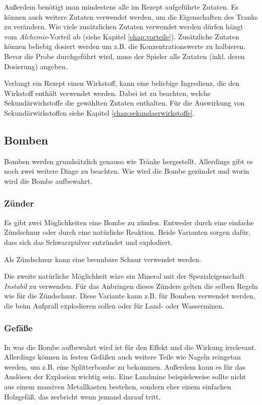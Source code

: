 Außerdem benötigt man mindestens alle im Rezept aufgeführte Zutaten. Es können auch weitere Zutaten verwendet werden, um die Eigenschaften des Tranks zu verändern. Wie viele zusätzlichen Zutaten verwendet werden dürfen hängt vom \textit{Alchemie}-Vorteil ab (siehe Kapitel \ref{chap:vorteile}). Zusätzliche Zutaten können beliebig dosiert werden um z.B. die Konzentrationswerte zu halbieren. Bevor die Probe durchgeführt wird, muss der Spieler alle Zutaten (inkl. deren Dosierung) angeben.

Verlangt ein Rezept einen Wirkstoff, kann eine beliebige Ingredienz, die den Wirkstoff enthält verwendet werden. Dabei ist zu beachten, welche Sekundärwirkstoffe die gewählten Zutaten enthalten. Für die Auswirkung von Sekundärwirkstoffen siehe Kapitel \ref{chap:sekundaerwirkstoffe}.

\subsection{Bomben}
\label{chap:herstellung_von_bomben}
Bomben werden grundsätzlich genauso wie Tränke hergestellt. Allerdings gibt es noch zwei weitere Dinge zu beachten. Wie wird die Bombe gezündet und worin wird die Bombe aufbewahrt.

\subsubsection{Zünder}
Es gibt zwei Möglichkeiten eine Bombe zu zünden. Entweder durch eine einfache Zündschnur oder durch eine natürliche Reaktion. Beide Varianten sorgen dafür, dass sich das Schwarzpulver entzündet und explodiert.

Als Zündschnur kann eine brennbare Schnur verwendet werden.

Die zweite natürliche Möglichkeit wäre ein Mineral mit der Spezialeigenschaft \textit{Instabil} zu verwenden. Für das Anbringen dieses Zünders gelten die selben Regeln wie für die Zündschnur. Diese Variante kann z.B. für Bomben verwendet werden, die beim Aufprall explodieren sollen oder für Land- oder Wasserminen.

\subsubsection{Gefäße}
In was die Bombe aufbewahrt wird ist für den Effekt und die Wirkung irrelevant. Allerdings können in festen Gefäßen auch weitere Teile wie Nageln reingetan werden, um z.B. eine Splitterbombe zu bekommen. Außerdem kann es für das Auslösen der Explosion wichtig sein. Eine Landmine beispielsweise sollte nicht aus einem massiven Metallkasten bestehen, sondern eher einem einfachen Holzgefäß, das zerbricht wenn jemand darauf tritt.

